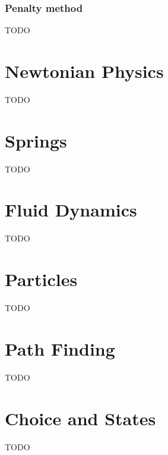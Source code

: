 \documentclass[a4paper]{article}
\begin{document}
\subsubsection{Penalty method}

TODO

\section{Newtonian Physics}

TODO

\section{Springs}

TODO

\section{Fluid Dynamics}

TODO

\section{Particles}

TODO

\section{Path Finding}

TODO

\section{Choice and States}

TODO
\end{document}
